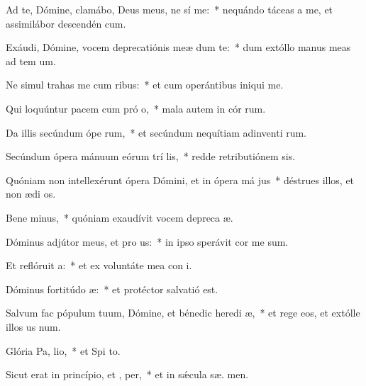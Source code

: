 \item Ad te, Dómine, clamábo, Deus meus, ne sí  me:~* nequándo táceas a me, et assimilábor descendén  cum.
\item Exáudi, Dómine, vocem deprecatiónis meæ dum   te:~* dum extóllo manus meas ad tem  um.
\item Ne simul trahas me cum ribus:~* et cum operántibus iniqui   me.
\item Qui loquúntur pacem cum pró o,~* mala autem in cór rum.
\item Da illis secúndum ópe rum,~* et secúndum nequítiam adinventi rum.
\item Secúndum ópera mánuum eórum trí lis,~* redde retributiónem  sis.
\item Quóniam non intellexérunt ópera Dómini, et in ópera má jus~* déstrues illos, et non ædi os.
\item Bene minus,~* quóniam exaudívit vocem depreca æ.
\item Dóminus adjútor meus, et pro us:~* in ipso sperávit cor me   sum.
\item Et reflóruit  a:~* et ex voluntáte mea con i.
\item Dóminus fortitúdo  æ:~* et protéctor salvatió   est.
\item Salvum fac pópulum tuum, Dómine, et bénedic heredi æ,~* et rege eos, et extólle illos us  num.
\item Glória Pa,  lio,~* et Spi to.
\item Sicut erat in princípio, et ,  per,~* et in sǽcula sæ. men.
